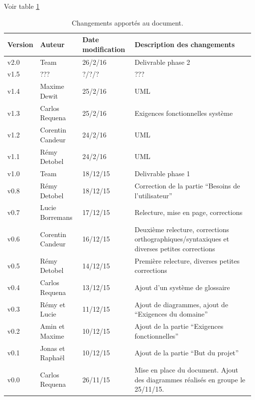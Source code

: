 \documentclass[11pt,a4paper]{article}
\begin{document}
Voir table \ref{tab:hist}


\begin{table}[h]
  \centering
  \begin{tabular}[ht]{|l|l|l|p{18em}|}
    \hline
    \textbf{Version}
    & \textbf{Auteur}
    & \textbf{Date modification}
    & \textbf{Description des changements}\\ \hline \hline
    v2.0 & Team & 26/2/16 & Delivrable phase 2 \\ \hline
    v1.5 & ??? & ?/?/? & ??? \\ \hline
    v1.4 & Maxime Dewit & 25/2/16 & UML \\ \hline
    v1.3 & Carlos Requena & 25/2/16 & Exigences fonctionnelles système
    \\ \hline
    v1.2 & Corentin Candeur & 24/2/16 & UML \\ \hline
    v1.1 & Rémy Detobel & 24/2/16 & UML \\ \hline
    v1.0 & Team & 18/12/15 & Delivrable phase 1 \\ \hline
    v0.8 & Rémy Detobel & 18/12/15 & Correction de la partie ``Besoins de l'utilisateur'' \\ \hline
    v0.7 & Lucie Borremans & 17/12/15 & Relecture, mise en page, corrections \\ \hline
     v0.6 & Corentin Candeur & 16/12/15 & Deuxième relecture, corrections orthographiques/syntaxiques et diverses petites corrections \\ \hline
    v0.5 & Rémy Detobel & 14/12/15 & Première relecture, diverses petites corrections \\ \hline
    v0.4 & Carlos Requena  & 13/12/15 & Ajout d'un système de glossaire \\ \hline
    v0.3 & Rémy et Lucie  & 11/12/15 & Ajout de diagrammes, ajout de ``Exigences du domaine'' \\ \hline
    v0.2 & Amin et Maxime & 10/12/15 & Ajout de la partie ``Exigences fonctionnelles''\\ \hline
    v0.1 & Jonas et Raphaël & 10/12/15 & Ajout de la partie ``But du projet''\\ \hline
    v0.0 & Carlos Requena & 26/11/15 & Mise en place du document. Ajout des diagrammes réalisés en groupe le 25/11/15.\\ \hline
  \end{tabular}
  \caption{Changements apportés au document.}
  \label{tab:hist}
\end{table}


\glsaddall
\printnoidxglossaries
\end{document}
